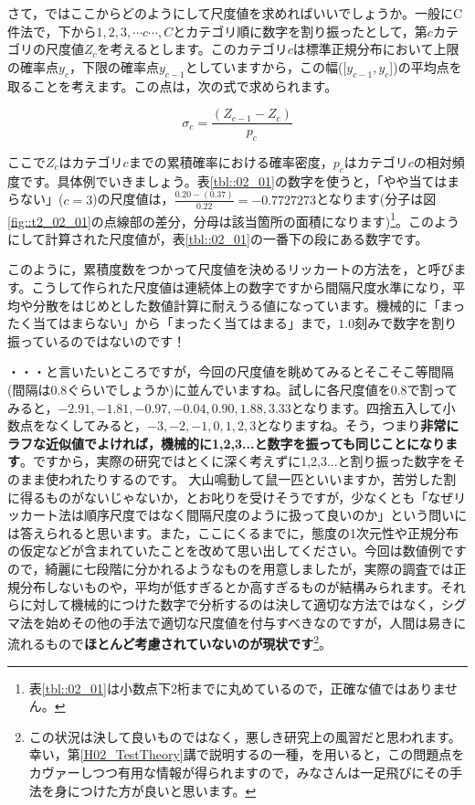 \documentclass{ltjsbook}
\begin{document}
さて，ではここからどのようにして尺度値を求めればいいでしょうか。一般にC件法で，下から$1,2,3,\cdots c\cdots, C$とカテゴリ順に数字を割り振ったとして，第$c$カテゴリの尺度値$Z_c$を考えるとします。このカテゴリ$c$は標準正規分布において上限の確率点$y_c$，下限の確率点$y_{c-1}$としていますから，この幅([$y_{c-1} , y_c$])の平均点を取ることを考えます。この点は，次の式で求められます。

\[ \sigma_c = \frac{(Z_{c-1} - Z_{c})}{p_c} \]

ここで$Z_c$はカテゴリ$c$までの累積確率における確率密度，$p_c$はカテゴリ$c$の相対頻度です。具体例でいきましょう。表\ref{tbl::02_01}の数字を使うと，「やや当てはまらない」($c=3$)の尺度値は，$\frac{0.20-(0.37)}{0.22}=-0.7727273$となります(分子は図\ref{fig::t2_02_01}の点線部の差分，分母は該当箇所の面積になります)\footnote{表\ref{tbl::02_01}は小数点下2桁までに丸めているので，正確な値ではありません。}。このようにして計算された尺度値が，表\ref{tbl::02_01}の一番下の段にある数字です。

このように，累積度数をつかって尺度値を決めるリッカートの方法を，と呼びます。こうして作られた尺度値は連続体上の数字ですから間隔尺度水準になり，平均や分散をはじめとした数値計算に耐えうる値になっています。機械的に「まったく当てはまらない」から「まったく当てはまる」まで，$1.0$刻みで数字を割り振っているのではないのです！


・・・と言いたいところですが，今回の尺度値を眺めてみるとそこそこ等間隔(間隔は$0.8$ぐらいでしょうか)に並んでいますね。試しに各尺度値を0.8で割ってみると，$-2.91,-1.81,-0.97, -0.04,0.90, 1.88, 3.33$となります。四捨五入して小数点をなくしてみると，$-3,-2,-1,0,1,2,3$となりますね。そう，つまり\textbf{非常にラフな近似値でよければ，機械的に1,2,3...と数字を振っても同じことになります}。ですから，実際の研究ではとくに深く考えずに1,2,3...と割り振った数字をそのまま使われたりするのです。
大山鳴動して鼠一匹といいますか，苦労した割に得るものがないじゃないか，とお叱りを受けそうですが，少なくとも「なぜリッカート法は順序尺度ではなく間隔尺度のように扱って良いのか」という問いには答えられると思います。また，ここにくるまでに，態度の1次元性や正規分布の仮定などが含まれていたことを改めて思い出してください。今回は数値例ですので，綺麗に七段階に分かれるようなものを用意しましたが，実際の調査では正規分布しないものや，平均が低すぎるとか高すぎるものが結構みられます。それらに対して機械的につけた数字で分析するのは決して適切な方法ではなく，シグマ法を始めその他の手法で適切な尺度値を付与すべきなのですが，人間は易きに流れるもので\textbf{ほとんど考慮されていないのが現状です}\footnote{この状況は決して良いものではなく，悪しき研究上の風習だと思われます。幸い，第\ref{H02_TestTheory}講で説明するの一種，を用いると，この問題点をカヴァーしつつ有用な情報が得られますので，みなさんは一足飛びにその手法を身につけた方が良いと思います。}。
\end{document}

